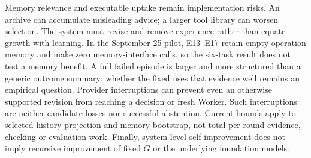 Memory relevance and executable uptake remain implementation risks.  An
archive can accumulate misleading advice; a larger tool library can worsen
selection.  The system must revise and remove experience rather than equate
growth with learning.  In the September 25 pilot, E13--E17 retain empty
operation memory and make zero memory-interface calls, so the six-task result
does not test a memory benefit.  A full failed episode is larger and more structured
than a generic outcome summary; whether the fixed \Evolver{} uses that evidence
well remains an empirical question. Provider interruptions can prevent even
an otherwise supported revision from reaching a decision or fresh Worker.
Such interruptions are neither candidate losses nor successful abstention.
Current bounds apply to selected-history projection and memory bootstrap,
not total per-round evidence, checking or evaluation work. Finally, system-level
self-improvement does not imply recursive improvement of fixed $G$ or the
underlying foundation models.
